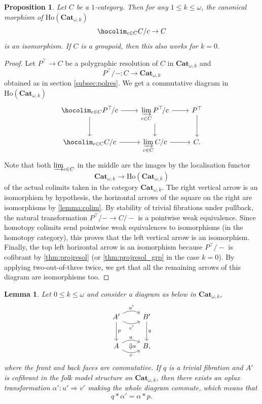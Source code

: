 \documentclass[reqno]{amsart}
\theoremstyle{plain}
\newtheorem{proposition}[subsubsection]{Proposition}
\newtheorem{lemma}[subsubsection]{Lemma}
\theoremstyle{definition}
\theoremstyle{remark}
\newcommand{\ilim}{\varinjlim} %
\newcommand{\tr}[2]{#1/#2} %
\newcommand{\wsk}{\ast} %
\newcommand{\ctg}[1]{\mathbf{#1}}  %
\newcommand{\Cat}{\ctg{Cat}}   %
\newcommand{\opCat}[1]{\Cat_{\omega,#1}} %
\newcommand{\frgp}[1]{#1^\top} %
\newcommand{\oo}{\ensuremath{\omega}}
\newcommand{\Loc}[1]{\mathrm{Ho}(#1)} %
\newcommand{\nbd}{\nobreakdash} %
\begin{document}
\begin{proposition}\label{prop:hocolimtr}
  Let $C$ be a $1$\nbd-category. Then for any $1 \leq k \leq \oo$, the canonical morphism of
  $\Loc{\opCat{k}}$
  \[
    \hocolim_{c\in C }\tr{C}{c} \to C
    \]
  is an isomorphism. If $C$ is a groupoid, then this also works for
  $k=0$.
\end{proposition}
\begin{proof}
  Let $\frgp{P} \to C$ be a polygraphic resolution of $C$ in
  $\opCat{k}$ and \[\tr{\frgp P\!}{-} \colon C \to \opCat{k}\] obtained
  as in section \ref{subsec:polres}. We get a commutative diagram in
  $\Loc{\opCat{k}}$
  \[
    \begin{tikzcd}
      \displaystyle\hocolim_{c \in C}\tr{\frgp P\!}{c} \ar[d] \ar[r]& \displaystyle\ilim_{c \in
        C}\tr{\frgp P\!}{c} \ar[d] \ar[r] & \frgp P \ar[d] \\
      \displaystyle\hocolim_{c \in C}\tr{C}{c} \ar[r]&\displaystyle\ilim_{c \in C}\tr{C}{c}\ar[r] & C.
    \end{tikzcd}
  \]
  Note that both $\ilim_{c \in C}$ in the middle are the images by the
  localisation functor \[\opCat{k} \to \Loc{\opCat{k}}\]
  of the actual
  colimits taken in the category $\opCat{k}$. The right vertical
  arrow is an isomorphism by hypothesis, the horizontal arrows of the
  square on the right are isomorphisms by \cref{lemma:colim}. By
  stability of trivial fibrations under pullback, the natural transformation
  $\tr{\frgp P\!}{-} \to \tr{C}{-}$ is a pointwise weak equivalence. Since homotopy colimits
  send pointwise weak equivalences to isomorphisms (in the homotopy
  category), this proves that the left vertical arrow is an
  isomorphism. Finally, the top left
  horizontal arrow is an isomorphism
  because $\tr{\frgp P\!}{-}$ is cofibrant by \cref{thm:projresol} (or
  \cref{thm:projresol_grp} in the case $k=0$). By applying
  two-out-of-three twice, we get that all the remaining arrows of this diagram
  are isomorphisms too. 
\end{proof}
\begin{lemma}\label{lemma:liftoplax}
  Let $0 \leq k \leq \omega$ and consider a diagram as below in $\opCat{k}$, 
  \[
    \begin{tikzcd}[row sep=large]
      A' \ar[d,"p"]\ar[r,bend left,"u'"] \ar[r,bend right,"v'"']& B' \ar[d,"q"] \\
      A \ar[r,bend left,"u",""{name=A,below}] \ar[r,bend
      right,"v"',""{name=B,above}]& B,
      \ar[from=A,to=B,Rightarrow,"\alpha"]
    \end{tikzcd}
  \]
  where the front and back faces are commutative. If $q$ is a trivial
  fibration and $A'$ is cofibrant in the folk model structure on
  $\opCat{k}$, then there exists an oplax transformation $\alpha'
  \colon u' \Rightarrow v'$ making the whole diagram commute, which means
  that
  \[
    q\wsk \alpha' = \alpha \wsk p.
  \]
\end{lemma}
\end{document}
